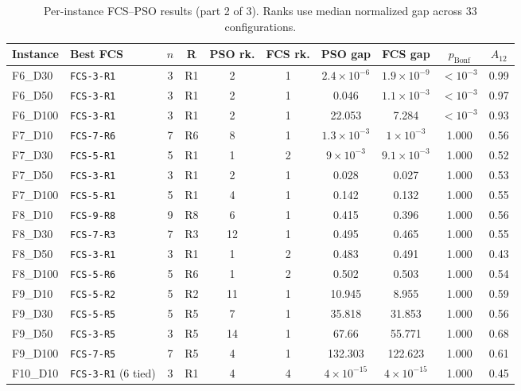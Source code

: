 \begin{table}[H]
\centering
\footnotesize
\caption{Per-instance FCS--PSO results (part 2 of 3). Ranks use median normalized gap across 33 configurations.}
\label{tab:function_level_full_2}
\setlength{\tabcolsep}{3pt}
\begin{tabular}{llcccccccc}
\toprule
\textbf{Instance} & \textbf{Best FCS} & \boldmath$n$ & \textbf{R} & \textbf{PSO rk.} & \textbf{FCS rk.} & \textbf{PSO gap} & \textbf{FCS gap} & \boldmath$p_{\mathrm{Bonf}}$ & \boldmath$A_{12}$ \\
\midrule
F6\_D30 & \texttt{FCS-3-R1} & 3 & R1 & 2 & 1 & $2.4\!\times10^{-6}$ & $1.9\!\times10^{-9}$ & $<10^{-3}$ & 0.99 \\
F6\_D50 & \texttt{FCS-3-R1} & 3 & R1 & 2 & 1 & 0.046 & $1.1\!\times10^{-3}$ & $<10^{-3}$ & 0.97 \\
F6\_D100 & \texttt{FCS-3-R1} & 3 & R1 & 2 & 1 & 22.053 & 7.284 & $<10^{-3}$ & 0.93 \\
F7\_D10 & \texttt{FCS-7-R6} & 7 & R6 & 8 & 1 & $1.3\!\times10^{-3}$ & $1\!\times10^{-3}$ & 1.000 & 0.56 \\
F7\_D30 & \texttt{FCS-5-R1} & 5 & R1 & 1 & 2 & $9\!\times10^{-3}$ & $9.1\!\times10^{-3}$ & 1.000 & 0.52 \\
F7\_D50 & \texttt{FCS-3-R1} & 3 & R1 & 2 & 1 & 0.028 & 0.027 & 1.000 & 0.53 \\
F7\_D100 & \texttt{FCS-5-R1} & 5 & R1 & 4 & 1 & 0.142 & 0.132 & 1.000 & 0.55 \\
F8\_D10 & \texttt{FCS-9-R8} & 9 & R8 & 6 & 1 & 0.415 & 0.396 & 1.000 & 0.56 \\
F8\_D30 & \texttt{FCS-7-R3} & 7 & R3 & 12 & 1 & 0.495 & 0.465 & 1.000 & 0.55 \\
F8\_D50 & \texttt{FCS-3-R1} & 3 & R1 & 1 & 2 & 0.483 & 0.491 & 1.000 & 0.43 \\
F8\_D100 & \texttt{FCS-5-R6} & 5 & R6 & 1 & 2 & 0.502 & 0.503 & 1.000 & 0.54 \\
F9\_D10 & \texttt{FCS-5-R2} & 5 & R2 & 11 & 1 & 10.945 & 8.955 & 1.000 & 0.59 \\
F9\_D30 & \texttt{FCS-5-R5} & 5 & R5 & 7 & 1 & 35.818 & 31.853 & 1.000 & 0.56 \\
F9\_D50 & \texttt{FCS-3-R5} & 3 & R5 & 14 & 1 & 67.66 & 55.771 & 1.000 & 0.68 \\
F9\_D100 & \texttt{FCS-7-R5} & 7 & R5 & 4 & 1 & 132.303 & 122.623 & 1.000 & 0.61 \\
F10\_D10 & \texttt{FCS-3-R1} (6 tied) & 3 & R1 & 4 & 4 & $4\!\times10^{-15}$ & $4\!\times10^{-15}$ & 1.000 & 0.45 \\

\end{tabular}
\end{table}
